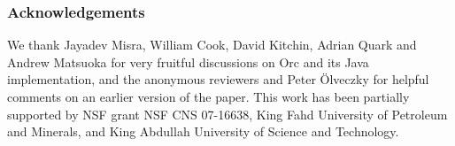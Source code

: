 \documentclass{eptcs}
\begin{document}
\subsubsection*{Acknowledgements}
We thank Jayadev Misra, William Cook, David Kitchin, Adrian Quark and Andrew Matsuoka for very fruitful discussions on Orc and its Java implementation, and the anonymous reviewers and Peter \"{O}lveczky for helpful comments on an earlier version of the paper. This work has been partially supported by NSF grant NSF CNS 07-16638, King Fahd University of Petroleum and Minerals, and King Abdullah University of Science and Technology.




\end{document}
